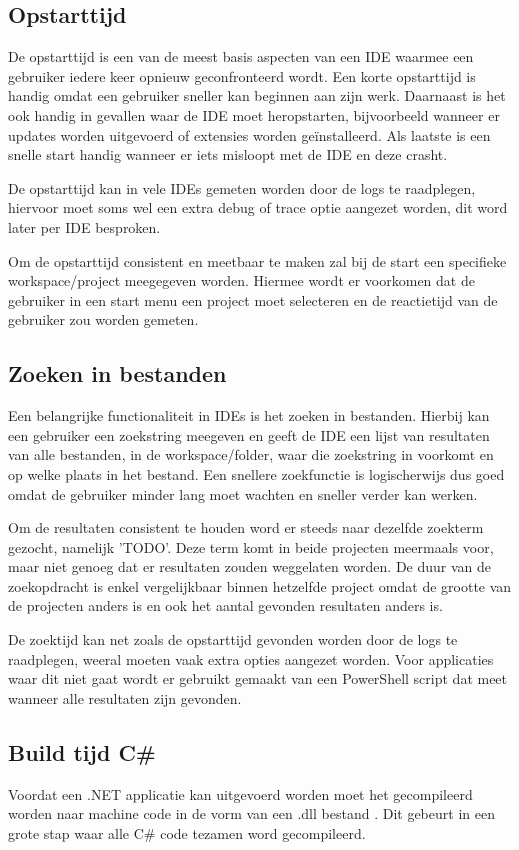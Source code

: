 \subsection{Opstarttijd}
De opstarttijd is een van de meest basis aspecten van een IDE waarmee een gebruiker iedere keer opnieuw geconfronteerd wordt. Een korte opstarttijd is handig omdat een gebruiker sneller kan beginnen aan zijn werk. Daarnaast is het ook handig in gevallen waar de IDE moet heropstarten, bijvoorbeeld wanneer er updates worden uitgevoerd of extensies worden geïnstalleerd. Als laatste is een snelle start handig wanneer er iets misloopt met de IDE en deze crasht.

De opstarttijd kan in vele IDEs gemeten worden door de logs te raadplegen, hiervoor moet soms wel een extra debug of trace optie aangezet worden, dit word later per IDE besproken.

Om de opstarttijd consistent en meetbaar te maken zal bij de start een specifieke workspace/project meegegeven worden. Hiermee wordt er voorkomen dat de gebruiker in een start menu een project moet selecteren en de reactietijd van de gebruiker zou worden gemeten.

\subsection{Zoeken in bestanden}
Een belangrijke functionaliteit in IDEs is het zoeken in bestanden. Hierbij kan een gebruiker een zoekstring meegeven en geeft de IDE een lijst van resultaten van alle bestanden, in de workspace/folder, waar die zoekstring in voorkomt en op welke plaats in het bestand. Een snellere zoekfunctie is logischerwijs dus goed omdat de gebruiker minder lang moet wachten en sneller verder kan werken.

Om de resultaten consistent te houden word er steeds naar dezelfde zoekterm gezocht, namelijk 'TODO'. Deze term komt in beide projecten meermaals voor, maar niet genoeg dat er resultaten zouden weggelaten worden. De duur van de zoekopdracht is enkel vergelijkbaar binnen hetzelfde project omdat de grootte van de projecten anders is en ook het aantal gevonden resultaten anders is.

De zoektijd kan net zoals de opstarttijd gevonden worden door de logs te raadplegen, weeral moeten vaak extra opties aangezet worden. Voor applicaties waar dit niet gaat wordt er gebruikt gemaakt van een PowerShell script dat meet wanneer alle resultaten zijn gevonden.

\subsection{Build tijd C\#}
Voordat een .NET applicatie kan uitgevoerd worden moet het gecompileerd worden naar machine code in de vorm van een .dll bestand \autocite{Yu2022}. Dit gebeurt in een grote stap waar alle C\# code tezamen word gecompileerd.

